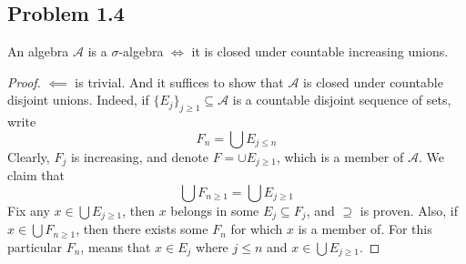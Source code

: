 \documentclass[../../main.tex]{subfiles}
\begin{document}
\providecommand{\mustar}{\mu^*}
\providecommand{\calm}{\mathcal{M}}
\providecommand{\caln}{\mathcal{N}}
\subsection*{Problem 1.4}
\begin{wts}
    An algebra $\mathcal{A}$ is a $\sigma$-algebra $\iff$ it is closed under countable increasing unions.
\end{wts}
\begin{proof}
    $\impliedby$ is trivial. And it suffices to show that $\mathcal{A}$ is closed under countable disjoint unions. Indeed, if $\{E_j\}_{j\geq 1}\subseteq \mathcal{A}$ is a countable disjoint sequence of sets, write
    \[
    F_n=\bigcup E_{j\leq n}
    \]
    Clearly, $F_j$ is increasing, and denote $F=\cup E_{j\geq 1}$, which is a member of $\mathcal{A}$. We claim that
    \[
    \bigcup F_{n\geq 1}=\bigcup E_{j\geq 1}
    \]
    Fix any $x\in\bigcup E_{j\geq 1}$, then $x$ belongs in some $E_j\subseteq F_j$, and $\supseteq$ is proven. Also, if $x\in\bigcup F_{n\geq 1}$, then there exists some $F_n$ for which $x$ is a member of. For this particular $F_n$, means that $x\in E_j$ where $j\leq n$ and $x\in \bigcup E_{j\geq 1}$.
\end{proof}
\end{document}
